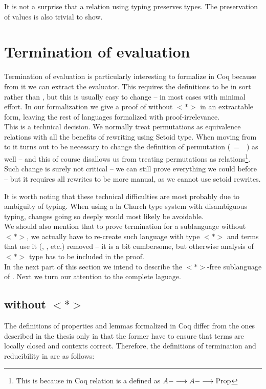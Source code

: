 It is not a surprise that a relation using typing preserves types. The preservation of values is also trivial to show.

\section{Termination of evaluation}

Termination of evaluation is particularly interesting to formalize in Coq because from it we can extract the evaluator. This requires the definitions to be in sort \Type{} rather than \Prop{}, but this is usually easy to change -- in most cases with minimal effort. In our formalization we give a proof of \langLF{} without $<*>$ in an extractable form, leaving the rest of languages formalized with proof-irrelevance.\\

This is a technical decision. We normally treat permutations as equivalence relations with all the benefits of rewriting using Setoid type. When moving from \Prop{} to \Type{} it turns out to be necessary to change the definition of permutation ($~=~$~) as well -- and this of course disallows us from treating permutations as relations\footnote{This is because in Coq relation is a defined as $ A ---> A ---> \text{Prop}{}$}. Such change is surely not critical -- we can still prove everything we could before -- but it requires all rewrites to be more manual, as we cannot use setoid rewrites.

It is worth noting that these technical difficulties are most probably due to ambiguity of typing. When using a la Church type system with disambiguous typing, changes going so deeply would most likely be avoidable. \\

We should also mention that to prove termination for a sublanguage without $<*>$, we actually have to re-create such language with type $<*>$ and terms that use it (\heree{}, , etc.) removed -- it is a bit cumbersome, but otherwise analysis of $<*>$ type has to be included in the proof.\\

In the next part of this section we intend to describe the $<*>$-free sublanguage of \langLF{}. Next we turn our attention to the complete \langLF{} laguage.

\subsection{\langLF{} without $<*>$}
The definitions of properties and lemmas formalized in Coq differ from the ones described in the thesis only in that the former have to ensure that terms are locally closed and contexts correct. Therefore, the definitions of termination and reducibility in \langLF{}  are as follows:

